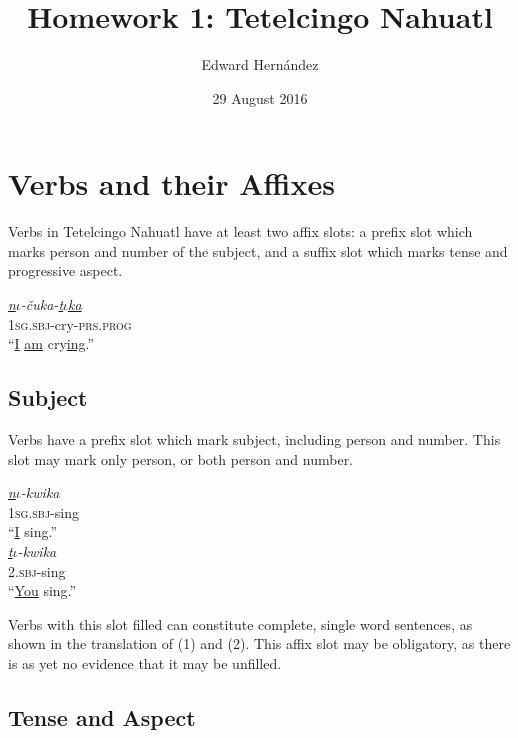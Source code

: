 \documentclass[doc,12pt]{apa6}
\begin{document}
\title{Homework 1: Tetelcingo Nahuatl}
\author{Edward Hern\'{a}ndez}
\date{29 August 2016}
\maketitle

\setcounter{secnumdepth}{3}

\section{Verbs and their Affixes}

Verbs in Tetelcingo Nahuatl have at least two affix slots: a prefix slot which
marks person and number of the subject, and a suffix slot which marks tense and
progressive aspect.

\begin{exe}
	\ex \textit{\underline{n$\iota$}-\v{c}uka-\underline{t$\iota$ka}} \\
	\textsc{1sg.sbj}-cry-\textsc{prs.prog} \\
	``\underline{I} \underline{am} cry\underline{ing}.''
\end{exe}

\subsection{Subject}

Verbs have a prefix slot which mark subject, including person and number. This
slot may mark only person, or both person and number.

\begin{exe}
	\ex \textit{\underline{n$\iota$}-kwika} \\
		\textsc{1sg.sbj}-sing \\
		``\underline{I} sing.'' \\
	\ex \textit{\underline{t$\iota$}-kwika} \\
		\textsc{2.sbj}-sing \\
		``\underline{You} sing.''
\end{exe}

Verbs with this slot filled can constitute complete, single word sentences, as
shown in the translation of (1) and (2). This affix slot may be obligatory, as
there is as yet no evidence that it may be unfilled.

\subsection{Tense and Aspect}
\end{document}

